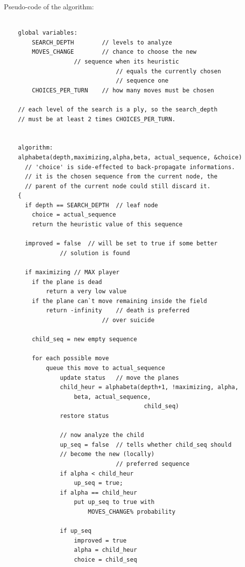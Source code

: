 Pseudo-code of the algorithm:
{\footnotesize
  \lstset{language=C}
  \begin{lstlisting}[frame=shadowbox,breaklines]
  	
    global variables:
    	SEARCH_DEPTH		// levels to analyze
        MOVES_CHANGE		// chance to choose the new
        			// sequence when its heuristic
                                // equals the currently chosen
                                // sequence one
        CHOICES_PER_TURN	// how many moves must be chosen
    
    // each level of the search is a ply, so the search_depth
    // must be at least 2 times CHOICES_PER_TURN.
    
    
    algorithm:
    alphabeta(depth,maximizing,alpha,beta, actual_sequence, &choice)
      // 'choice' is side-effected to back-propagate informations.
      // it is the chosen sequence from the current node, the
      // parent of the current node could still discard it.
    { 
      if depth == SEARCH_DEPTH	// leaf node
      	choice = actual_sequence
        return the heuristic value of this sequence
      
      improved = false	// will be set to true if some better
      			// solution is found
      
      if maximizing	// MAX player
      	if the plane is dead
        	return a very low value
        if the plane can`t move remaining inside the field
        	return -infinity	// death is preferred
                			// over suicide
        
        child_seq = new empty sequence
        
        for each possible move
        	queue this move to actual_sequence
                update status	// move the planes
                child_heur = alphabeta(depth+1, !maximizing, alpha,
					beta, actual_sequence,
                                        child_seq)
                restore status
        	
                // now analyze the child
                up_seq = false	// tells whether child_seq should
				// become the new (locally)
                                // preferred sequence
                if alpha < child_heur
                	up_seq = true;
                if alpha == child_heur
                	put up_seq to true with
                        MOVES_CHANGE% probability
                        
                if up_seq
                	improved = true
                	alpha = child_heur
                	choice = child_seq
                

\end{lstlisting}}
